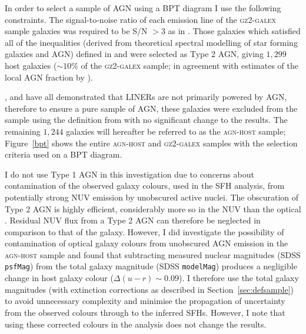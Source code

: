 In order to select a sample of AGN using a BPT diagram I use the following constraints. The signal-to-noise ratio of each emission line of the \textsc{gz2-galex} sample galaxies was required to be S/N $> 3$ as in \cite{schawinski10a}. Those galaxies which satisfied all of the inequalities (derived from theoretical spectral modelling of star forming galaxies and AGN) defined in \citet[][to separate SF galaxies from AGN]{kewley01} and \citet[][to separate SF galaxies from composite SF-AGN galaxies]{kauffmann03b} were selected as Type 2 AGN, giving $1,299$ host galaxies ($\sim10\%$ of the \textsc{gz2-galex} sample; in agreement with estimates of the local AGN fraction by \citealt{kauffmann04, pimbblet13}).

\cite{Sarzi10}, \cite{yan12} and \cite{Singh13} have all demonstrated that LINERs are not primarily powered by AGN, therefore to ensure a pure sample of AGN, these galaxies were excluded from the sample using the definition from \cite[][$55$ galaxies total]{kewley06} with no significant change to the results. The remaining $1,244$ galaxies will hereafter be referred to as the \textsc{agn-host} sample; Figure~\ref{bpt} shows the entire \textsc{agn-host} and \textsc{gz2-galex} samples with the selection criteria used on a BPT diagram.

I do not use Type 1 AGN in this investigation due to concerns about contamination of the observed galaxy colours, used in the SFH analysis, from potentially strong NUV emission by unobscured active nuclei. The obscuration of Type 2 AGN is highly efficient, considerably more so in the NUV than the optical \citep{Simmons11}. Residual NUV flux from a Type 2 AGN can therefore be neglected in comparison to that of the galaxy. However, I did investigate the possibility of contamination of optical galaxy colours from unobscured AGN emission in the \textsc{agn-host} sample and found that subtracting measured nuclear magnitudes (SDSS {\tt psfMag}) from the total galaxy magnitude (SDSS {\tt modelMag}) produces a negligible change in host galaxy colour ($\Delta(u-r) \sim 0.09$). I therefore use the total galaxy magnitudes (with extinction corrections as described in Section~\ref{sec:defsample}) to avoid unnecessary complexity and minimise the propagation of uncertainty from the observed colours through to the inferred SFHs. However, I note that using these corrected colours in the analysis does not change the results.


